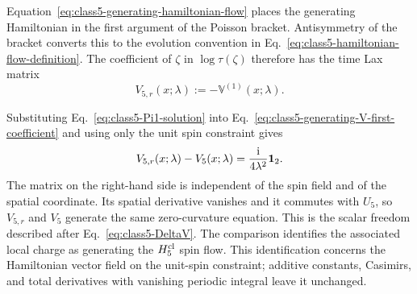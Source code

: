 Equation~\eqref{eq:class5-generating-hamiltonian-flow} places the generating
Hamiltonian in the first argument of the Poisson bracket.  Antisymmetry
of the bracket converts this to the evolution convention in
Eq.~\eqref{eq:class5-hamiltonian-flow-definition}.  The coefficient of
$\zeta$ in $\log\tau(\zeta)$ therefore has the time Lax matrix
\begin{equation}
V_{5,r}(x;\lambda):=-\mathbb V^{(1)}(x;\lambda).
\label{eq:class5-rmatrix-time-V-definition}
\end{equation}

Substituting Eq.~\eqref{eq:class5-Pi1-solution} into
Eq.~\eqref{eq:class5-generating-V-first-coefficient} and using only the unit
spin constraint gives
\begin{equation}
V_{5,r}(x;\lambda)-V_5(x;\lambda)
=
\frac{\mathrm{i}}{4\lambda^2}\mathbf{1}_2.
\label{eq:class5-rmatrix-vs-quantum-V}
\end{equation}
The matrix on the right-hand side is independent of the spin field and of
the spatial coordinate.  Its spatial derivative vanishes and it commutes
with $U_5$, so $V_{5,r}$ and $V_5$ generate the same zero-curvature equation.
This is the scalar freedom described after Eq.~\eqref{eq:class5-DeltaV}.
The comparison identifies the associated local charge as generating the
$H^{\rm cl}_5$ spin flow.  This identification concerns the Hamiltonian
vector field on the unit-spin constraint; additive constants, Casimirs,
and total derivatives with vanishing periodic integral leave it unchanged.
